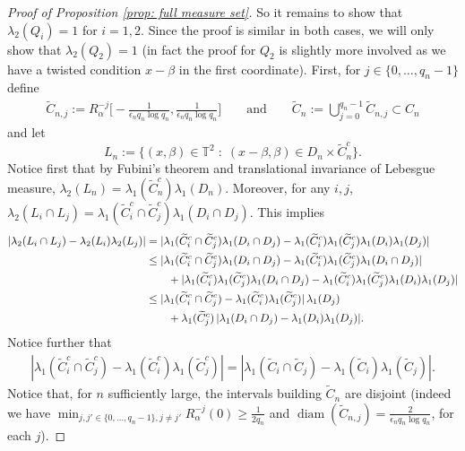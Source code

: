\documentclass[11pt]{amsart}
\theoremstyle{definition}
\numberwithin{equation}{section}
\def\T{\mathbb{T}}
\DeclareMathOperator{\diam}{diam}
\begin{document}
\begin{proof}[Proof of Proposition \ref{prop: full measure set}]
So it remains to show that $\lambda_2( Q_i)=1$ for $i=1,2$.
Since the proof is similar in both cases, we will only show that $\lambda_2( Q_2)=1$ (in fact the proof for $Q_2$ is slightly more involved as we have a twisted condition $x-\beta$ in the first coordinate).
First, for $j\in \{0,\ldots, q_{n}-1\}$ define
\begin{align*}
\widetilde{C}_{n,j}:=R_\alpha^{-j}\Big[-\frac{1}{\epsilon_n q_n\log q_n},\frac{1}{\epsilon_n q_n\log q_n}\Big]\qquad\text{and}\qquad
 \widetilde{C}_n:=\bigcup_{j=0}^{q_n-1} \widetilde{C}_{n,j}\subset C_n
\end{align*}
and let 
$$L_n:=\{(x,\beta)\in \T^2\;:\; (x-\beta,\beta)\in D_n\times \widetilde{C}_n^c\}.$$
Notice first that by Fubini's theorem and translational invariance of Lebesgue measure, $\lambda_2(L_n)=\lambda_1(\widetilde{C}_n^c)\lambda_1(D_n)$. Moreover, for any $i,j$, $\lambda_2(L_i\cap L_j)=  \lambda_1(\widetilde{C}_i^c\cap \widetilde{C}_j^c)\lambda_1(D_i\cap D_j)$. 
This implies
\begin{align}
 |\lambda_2(L_i\cap L_j)- \lambda_2(L_i)\lambda_2(L_j)|
 &=|\lambda_1(\widetilde{C}_i^c\cap \widetilde{C}_j^c)\lambda_1(D_i\cap D_j)- \lambda_1(\widetilde{C}_i^c)\lambda_1(\widetilde{C}_j^c)\lambda_1(D_i)\lambda_1(D_j)|\notag\\
  &\leq |\lambda_1(\widetilde{C}_i^c\cap \widetilde{C}_j^c)\lambda_1(D_i\cap D_j)
  - \lambda_1(\widetilde{C}_i^c)\lambda_1(\widetilde{C}_j^c)\lambda_1(D_i \cap D_j)|\notag\\
  &\qquad+|\lambda_1(\widetilde{C}_i^c)\lambda_1( \widetilde{C}_j^c)\lambda_1(D_i\cap D_j)- \lambda_1(\widetilde{C}_i^c)\lambda_1(\widetilde{C}_j^c)\lambda_1(D_i)\lambda_1(D_j)|\notag\\
 &\leq|\lambda_1(\widetilde{C}_i^c\cap \widetilde{C}_j^c)
 - \lambda_1(\widetilde{C}_i^c)\lambda_1(\widetilde{C}_j^c)|\,\lambda_1( D_j)\notag\\
 &\qquad + \lambda_1( \widetilde{C}_j^c)\,|\lambda_1(D_i\cap D_j)- \lambda_1(D_i)\lambda_1(D_j)|.\label{eq: Ln dep}
\end{align}
Notice further that 
\begin{align}
 |\lambda_1(\widetilde{C}_i^c\cap \widetilde{C}_j^c)
 - \lambda_1(\widetilde{C}_i^c)\lambda_1(\widetilde{C}_j^c)|
 =|\lambda_1(\widetilde{C}_i\cap \widetilde{C}_j)
 - \lambda_1(\widetilde{C}_i)\lambda_1(\widetilde{C}_j)|.\label{eq: Ci Cic}
\end{align}
Notice that, for $n$ sufficiently large, the intervals building $\widetilde{C}_n$ are disjoint (indeed we have $\min_{j,j'\in \{0, \ldots, q_{n}-1\}, j\neq j'} R_\alpha^{-j}(0)\geq \frac{1}{2q_n}$ and 
$\diam(\widetilde{C}_{n,j})=\frac{2}{\epsilon_n q_n \log q_n}$, for each $j$).


\end{proof}
\end{document}
